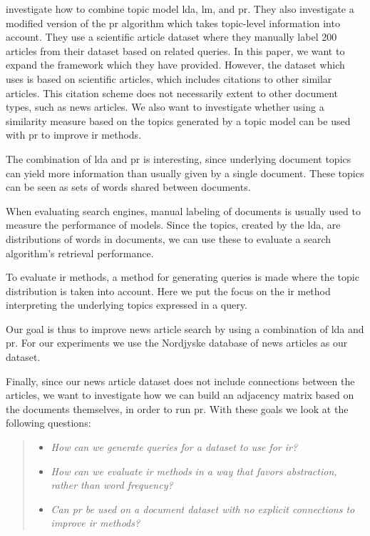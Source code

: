 \citeauthor{yang2009topic}\cite{yang2009topic} investigate how to combine topic model \gls{lda}, \gls{lm}, and \gls{pr}.
They also investigate a modified version of the \gls{pr} algorithm which takes topic-level information into account.
They use a scientific article dataset where they manually label 200 articles from their dataset based on related queries. 
In this paper, we want to expand the framework which they have provided.
However, the dataset which \cite{yang2009topic} uses is based on scientific articles, which includes citations to other similar articles.
This citation scheme does not necessarily extent to other document types, such as news articles.
We also want to investigate whether using a similarity measure based on the topics generated by a topic model can be used with \gls{pr} to improve \gls{ir} methods.

The combination of \gls{lda} and \gls{pr} is interesting, since underlying document topics can yield more information than usually given by a single document.
These topics can be seen as sets of words shared between documents. 

When evaluating search engines, manual labeling of documents is usually used to measure the performance of models\cite{yang2009topic}\cite{Tang2008}.
Since the topics, created by the \gls{lda}, are distributions of words in documents, we can use these to evaluate a search algorithm's retrieval performance. 

To evaluate \gls{ir} methods, a method for generating queries is made where the topic distribution is taken into account.
Here we put the focus on the \gls{ir} method interpreting the underlying topics expressed in a query.

Our goal is thus to improve news article search by using a combination of \gls{lda} and \gls{pr}.
For our experiments we use the Nordjyske database of news articles as our dataset.



Finally, since our news article dataset does not include connections between the articles, we want to investigate how we can build an adjacency matrix based on the documents themselves, in order to run \gls{pr}.
With these goals we look at the following questions:
\begin{quote}
	\begin{itemize}
		\item \emph{How can we generate queries for a dataset to use for \gls{ir}?}
		\item \emph{How can we evaluate \gls{ir} methods in a way that favors abstraction, rather than word frequency?}
	        \item \emph{Can \gls{pr} be used on a document dataset with no explicit connections to improve \gls{ir} methods?}
	\end{itemize}
\end{quote}




